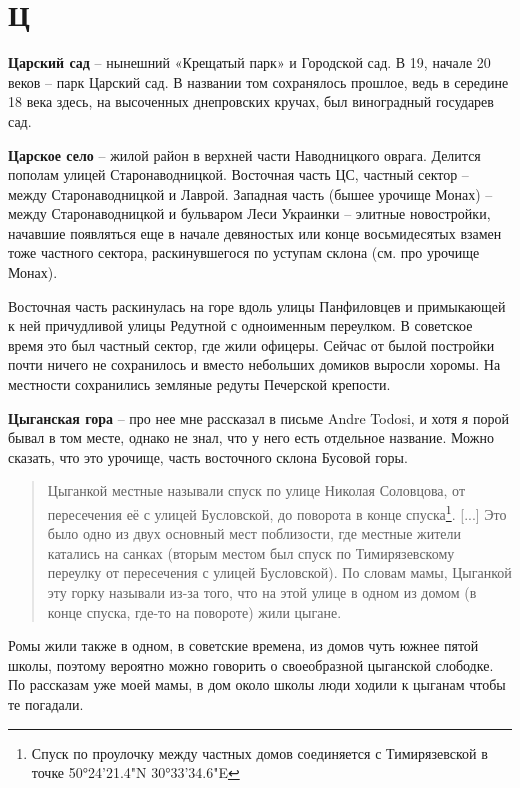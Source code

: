 \chapter*{Ц}

\textbf{Царский сад} – нынешний «Крещатый парк» и Городской сад. В 19, начале 20 веков – парк Царский сад. В названии том сохранялось прошлое, ведь в середине 18 века здесь, на высоченных днепровских кручах, был виноградный государев сад.\\

\medskip

\textbf{Царское село} – жилой район в верхней части Наводницкого оврага. Делится пополам улицей Старонаводницкой. Восточная часть ЦС, частный сектор – между Старонаводницкой и Лаврой. Западная часть (бышее урочище Монах) – между Старонаводницкой и бульваром Леси Украинки – элитные новостройки, начавшие появляться еще в начале девяностых или конце восьмидесятых взамен тоже частного сектора, раскинувшегося по уступам склона (см. про урочище Монах).

Восточная часть раскинулась на горе вдоль улицы Панфиловцев и примыкающей к ней причудливой улицы Редутной с одноименным переулком. В советское время это был частный сектор, где жили офицеры. Сейчас от былой постройки почти ничего не сохранилось и вместо небольших домиков выросли хоромы. На местности сохранились земляные редуты Печерской крепости.\\

\medskip

\textbf{Цыганская гора} – про нее мне рассказал в письме Andre Todosi, и хотя я порой бывал в том месте, однако не знал, что у него есть отдельное название. Можно сказать, что это урочище, часть восточного склона Бусовой горы.

\begin{quotation}
Цыганкой местные называли спуск по улице Николая Соловцова, от пересечения её с улицей Бусловской, до поворота в конце спуска\footnote{Спуск по проулочку между частных домов соединяется с Тимирязевской в точке 50°24'21.4"N 30°33'34.6"E}. [...] Это было одно из двух основный мест поблизости, где местные жители катались на санках (вторым местом был спуск по Тимирязевскому переулку от пересечения с улицей Бусловской). По словам мамы, Цыганкой эту горку называли из-за того, что на этой улице в одном из домом (в конце спуска, где-то на повороте) жили цыгане.
\end{quotation}

Ромы жили также в одном, в советские времена, из домов чуть южнее пятой школы, поэтому вероятно можно говорить о своеобразной цыганской слободке. По рассказам уже моей мамы, в дом около школы люди ходили к цыганам чтобы те погадали.\\

